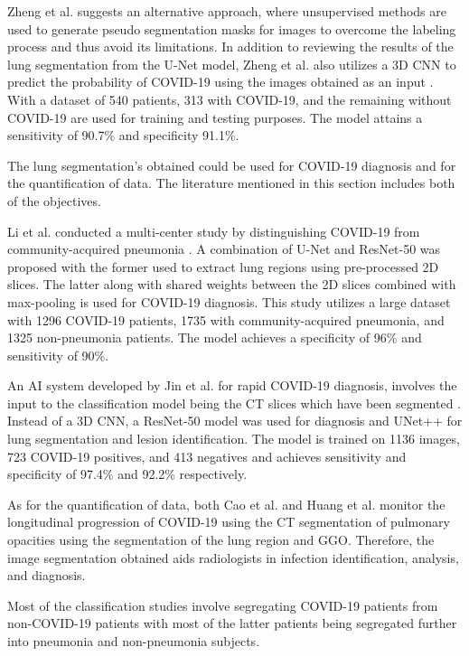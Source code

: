 Zheng et al. suggests an alternative approach, where unsupervised methods are used to generate pseudo segmentation masks for images to overcome 
the labeling process and thus avoid its limitations. In addition to reviewing the results of the lung segmentation from the U-Net model, Zheng et al. also utilizes a 3D CNN to predict the probability of 
COVID-19 using the images obtained as an input \cite{CXZ+2020}. With a 
dataset of 540 patients, 313 with COVID-19, and the remaining without COVID-19 
are used for training and testing purposes. The model attains  a sensitivity 
of 90.7\% and specificity 91.1\%.

The lung segmentation's obtained could be used for COVID-19 diagnosis and for the 
quantification of data. The literature mentioned in this section includes both of the 
objectives.

Li et al. conducted a multi-center study by distinguishing COVID-19 from community-acquired pneumonia \cite{LLL+2020}. A combination of U-Net and ResNet-50 was proposed with the former used to extract lung regions using pre-processed 2D slices. The latter along with shared weights between the 2D slices combined 
with max-pooling is used for COVID-19 diagnosis. This study utilizes a large dataset 
with 1296 COVID-19 patients, 1735 with community-acquired pneumonia, and 1325 
non-pneumonia patients. The model achieves a specificity of 96\% and sensitivity 
of 90\%.  

An AI system developed by Jin et al. for rapid COVID-19 diagnosis, involves the input to the classification model 
being the CT slices which have been segmented \cite{JSB+2020}. Instead of a 3D CNN, a ResNet-50 model was used for diagnosis
and UNet++ for lung segmentation and lesion identification. The model 
is trained on 1136 images, 723 COVID-19 positives, and 413 negatives and 
achieves sensitivity and specificity of 97.4\% and 92.2\% respectively.

As for the quantification of data, both Cao et al. \cite{CYZ+2020} and Huang et al. \cite{HLR+2020} monitor the longitudinal 
progression of COVID-19 using the CT segmentation of pulmonary opacities using the segmentation of 
the lung region and GGO. Therefore, the image segmentation obtained aids radiologists 
in infection identification, analysis, and diagnosis.

Most of the classification studies involve segregating COVID-19 patients 
from non-COVID-19 patients with most of the latter patients being segregated further 
into pneumonia and non-pneumonia subjects.

